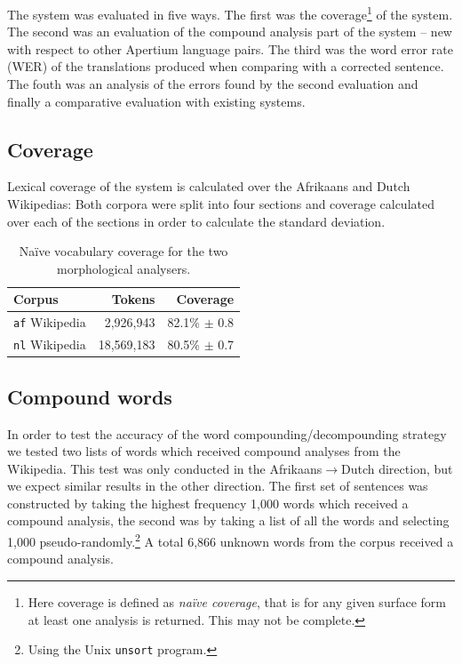 \documentclass[11pt]{article}
\begin{document}
The system was evaluated in five ways. The first was the 
coverage\footnote{Here coverage is defined as \emph{na\"ive coverage}, 
that is for any given surface form at least one analysis is returned. This 
may not be complete.} of the system. The second was an evaluation of the 
compound analysis part of the system -- new with respect to other 
Apertium language pairs. The third was the word error 
rate (WER) of the translations produced when comparing with a 
corrected sentence. The fouth was an analysis of the errors found by the second
evaluation and finally a comparative evaluation with existing systems.

\subsection{Coverage}

Lexical coverage of the system is calculated over the Afrikaans and Dutch Wikipedias:
Both corpora were split into four sections and coverage calculated over each of the 
sections in order to calculate the standard deviation.

\begin{table}
  \begin{center}
  \begin{tabular}{|l|r|r|}
   \hline
   {\bf Corpus}           & {\bf Tokens}    & {\bf Coverage}\\
   \hline
   {\tt af} Wikipedia     & 2,926,943       & 82.1\% $\pm$ 0.8 \\
   \hline
   {\tt nl} Wikipedia     & 18,569,183      & 80.5\% $\pm$ 0.7 \\
   \hline
  \end{tabular}
    \caption{Na\"ive vocabulary coverage for the two morphological analysers.}
    \label{table:coverage}
  \end{center}
\end{table}

\subsection{Compound words}

In order to test the accuracy of the word compounding/decompounding strategy
we tested two lists of words which received compound analyses from 
the Wikipedia. This test was only conducted in the Afrikaans$\rightarrow$Dutch
direction, but we expect similar results in the other direction. The first
set of sentences was constructed by taking the highest frequency 1,000 words which received 
a compound analysis, the second was by taking a list of all the words and selecting
1,000 pseudo-randomly.\footnote{Using the Unix {\small {\tt unsort}} program.} A total 
6,866 unknown words from the corpus received a compound analysis.
\end{document}
